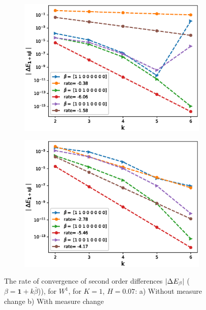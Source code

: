 \documentclass[11pt]{article}
\begin{document}
\begin{figure}[h!]
	\centering
	\begin{subfigure}{.4\textwidth}
		\centering
		\includegraphics[width=1\linewidth]{./figures/rBergomi_mixed_error_rates/without_change_measure/N_4/H_007/mixed_difference_order2_rbergomi_4steps_H_007_K_1_totally_hierarch_with_rate_W1}
		\caption{}
		\label{fig:sub3}
	\end{subfigure}%
	\begin{subfigure}{.4\textwidth}
		\centering
		\includegraphics[width=1\linewidth]{./figures/rBergomi_mixed_error_rates/partial_change_measure/N_4/H_007/mixed_difference_order2_rbergomi_4steps_H_007_K_1_totally_hierarch_with_rate_W1_change_measure_part_spec}
		\caption{}
		\label{fig:sub4}
	\end{subfigure}
	
	\caption{The rate of convergence of  second order differences $\left\lvert\Delta E_{\beta}\right\rvert$ ($\beta=\mathbf{1}+k \bar{\beta}$)), for $W^1$, for $K=1$, $H=0.07$: a) Without measure change b) With measure change}
	\label{fig:second_diff_comp_K_1_H_007_W_1}
\end{figure}
\end{document}
